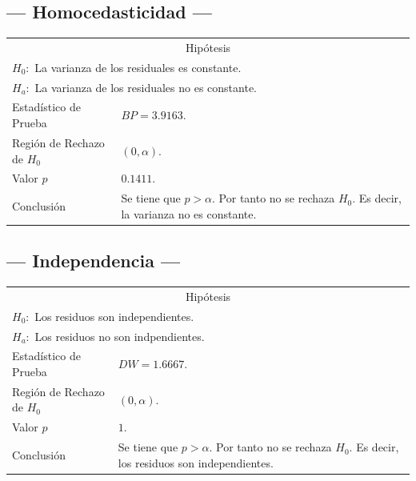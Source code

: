 \documentclass{article}
\begin{document}
\subsection{--- Homocedasticidad ---} %
\begin{center}
  \begin{tabular}{|l|p{8cm}|}
    \cline{1-2}
    \multicolumn{2}{|c|}{Hipótesis}\\ \cline{1-2}
    \multicolumn{2}{|l|}{\(H_0:\) La varianza de los residuales es constante.} \\ 
    \multicolumn{2}{|l|}{\(H_a:\) La varianza de los residuales no es constante.} \\ \cline{1-2}
    Estadístico de Prueba & \(BP = 3.9163\).\\ \cline{1-2} 
		Región de Rechazo de \(H_0\) & \((0, \alpha )\).\\ \cline{1-2} 
    Valor \(p\) & \(0.1411\).\\ \cline{1-2} 
    Conclusión & Se tiene que \(p> \alpha\). \newline 
		Por tanto no se rechaza \(H_0\). \newline 
		Es decir, la varianza no es constante. \\ \cline{1-2} 
  \end{tabular}
\end{center}

\subsection{--- Independencia ---} %
\begin{center}
  \begin{tabular}{|l|p{8cm}|}
    \cline{1-2}
    \multicolumn{2}{|c|}{Hipótesis}\\ \cline{1-2}
    \multicolumn{2}{|l|}{\(H_0:\) Los residuos son independientes.} \\ 
    \multicolumn{2}{|l|}{\(H_a:\) Los residuos no son indpendientes.} \\ \cline{1-2}
    Estadístico de Prueba & \(DW = 1.6667\).\\ \cline{1-2} 
		Región de Rechazo de \(H_0\) & \((0, \alpha )\).\\ \cline{1-2} 
    Valor \(p\) & \(1\).\\ \cline{1-2} 
    Conclusión & Se tiene que \(p> \alpha\). \newline 
		Por tanto no se rechaza \(H_0\). \newline 
		Es decir, los residuos son independientes.\\ \cline{1-2} 
  \end{tabular}
\end{center}
\end{document}

